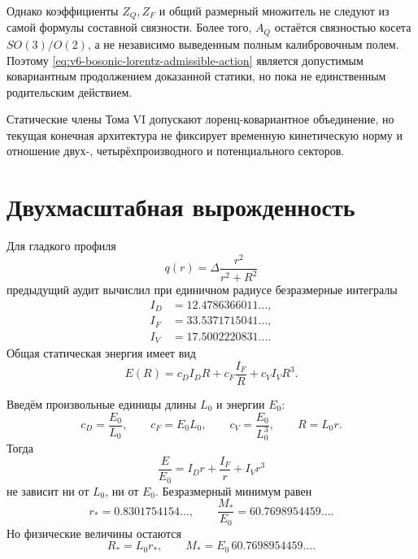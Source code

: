 Однако коэффициенты $Z_Q,Z_F$ и общий размерный множитель не следуют из
самой формулы составной связности. Более того, $A_Q$ остаётся связностью
косета $SO(3)/O(2)$, а не независимо выведенным полным калибровочным полем.
Поэтому \eqref{eq:v6-bosonic-lorentz-admissible-action} является допустимым
ковариантным продолжением доказанной статики, но пока не единственным
родительским действием.

\begin{proposition}
Статические члены Тома VI допускают лоренц-ковариантное объединение, но
текущая конечная архитектура не фиксирует временную кинетическую норму и
отношение двух-, четырёхпроизводного и потенциального секторов.
\end{proposition}

\section{Двухмасштабная вырожденность}

Для гладкого профиля
\begin{equation}
 q(r)=\Delta\frac{r^2}{r^2+R^2}
\end{equation}
предыдущий аудит вычислил при единичном радиусе безразмерные интегралы
\begin{align}
 I_D&=12.4786366011\ldots,\\
 I_F&=33.5371715041\ldots,\\
 I_V&=17.5002220831\ldots.
\end{align}
Общая статическая энергия имеет вид
\begin{equation}
 E(R)=c_DI_DR+c_F\frac{I_F}{R}+c_VI_VR^3.
 \label{eq:v6-bosonic-parent-scale-energy}
\end{equation}

Введём произвольные единицы длины $L_0$ и энергии $E_0$:
\begin{equation}
 c_D=\frac{E_0}{L_0},\qquad
 c_F=E_0L_0,\qquad
 c_V=\frac{E_0}{L_0^3},\qquad R=L_0r.
\end{equation}
Тогда
\begin{equation}
 \frac{E}{E_0}=I_Dr+\frac{I_F}{r}+I_Vr^3
 \label{eq:v6-bosonic-dimensionless-energy}
\end{equation}
не зависит ни от $L_0$, ни от $E_0$. Безразмерный минимум равен
\begin{equation}
 r_*=0.8301754154\ldots,
 \qquad
 \frac{M_*}{E_0}=60.7698954459\ldots.
\end{equation}
Но физические величины остаются
\begin{equation}
 R_*=L_0r_*,\qquad M_*=E_0\,60.7698954459\ldots.
\end{equation}

